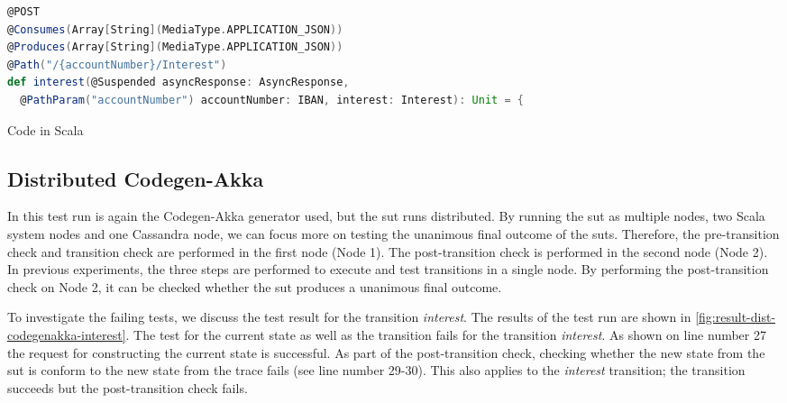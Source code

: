 \begin{sourcecode}[h!]
\begin{lstlisting}[language=scala]
@POST
@Consumes(Array[String](MediaType.APPLICATION_JSON))
@Produces(Array[String](MediaType.APPLICATION_JSON))
@Path("/{accountNumber}/Interest")
def interest(@Suspended asyncResponse: AsyncResponse,
  @PathParam("accountNumber") accountNumber: IBAN, interest: Interest): Unit = {
\end{lstlisting}
\caption{Code in Scala}\label{fig:scala-gen-interest-request}
\end{sourcecode}
\FloatBarrier


\subsection{Distributed Codegen-Akka}\label{sec:bug-dist-nodes}
In this test run is again the Codegen-Akka generator used, but the \gls{sut}
runs distributed. By running the \gls{sut} as multiple nodes, two Scala system
nodes and one Cassandra node, we can focus more on testing the unanimous final
outcome of the \gls{sut}s. Therefore, the pre-transition check and transition
check are performed in the first node (Node 1). The post-transition check is
performed in the second node (Node 2). In previous experiments, the three steps
are performed to execute and test transitions in a single node. By performing
the post-transition check on Node 2, it can be checked whether the
\gls{sut} produces a unanimous final outcome.

To investigate the failing tests, we discuss the test result for the transition
\textit{interest}. The results of the test run are shown in
\autoref{fig:result-dist-codegenakka-interest}. The test for the current state
as well as the transition fails for the transition \textit{interest}.
As shown on line number 27 the request for constructing the current state is
successful. As part of the post-transition check, checking whether the new state
from the \gls{sut} is conform to the new state from the trace fails
(see line number 29-30). This also applies to the \textit{interest} transition;
the transition succeeds but the post-transition check fails.

